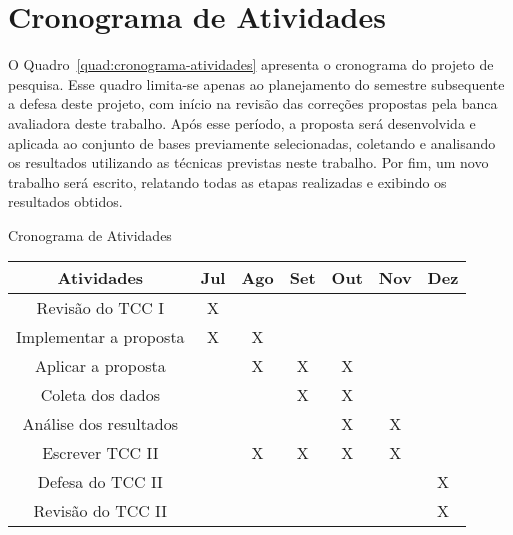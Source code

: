 
\chapter{Cronograma de Atividades}
    \label{cha:cronograma-atividades}
    O Quadro~\ref{quad:cronograma-atividades} apresenta o cronograma do projeto de pesquisa. Esse quadro limita\hyp{se} apenas ao planejamento do semestre subsequente a defesa deste projeto, com início na revisão das correções propostas pela banca avaliadora deste trabalho. Após esse período, a proposta será desenvolvida e aplicada ao conjunto de bases previamente selecionadas, coletando e analisando os resultados utilizando as técnicas previstas neste trabalho. Por fim, um novo trabalho será escrito, relatando todas as etapas realizadas e exibindo os resultados obtidos. 
    
    \begin{quadro}[h]
        \caption{Cronograma de Atividades}
        \centering
        \begin{tabular}{c c c c c c c} \hline
            \label{quad:cronograma-atividades}
            \textbf{Atividades} & \textbf{Jul} & \textbf{Ago} & \textbf{Set} & \textbf{Out} & \textbf{Nov} & \textbf{Dez} \\ \hline
            Revisão do TCC I        & X &   &   &   &   &   \\
            Implementar a proposta  & X & X &   &   &   &   \\
            Aplicar a proposta      &   & X & X & X &   &   \\
            Coleta dos dados        &   &   & X & X &   &   \\
            Análise dos resultados  &   &   &   & X & X &   \\
            Escrever TCC II         &   & X & X & X & X &   \\
            Defesa do TCC II        &   &   &   &   &   & X \\
            Revisão do TCC II       &   &   &   &   &   & X \\ \hline
        \end{tabular}
    \end{quadro}
